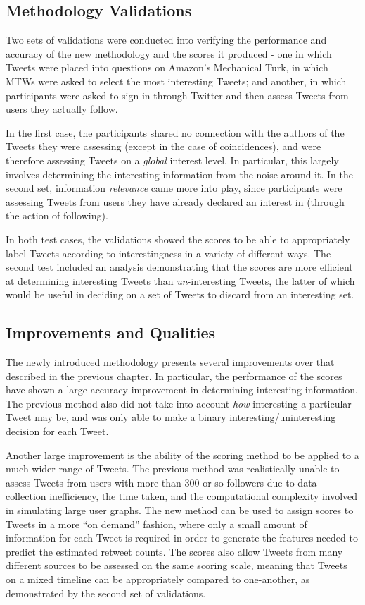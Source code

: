 \subsection{Methodology Validations}
Two sets of validations were conducted into verifying the performance and accuracy of the new methodology and the scores it produced - one in which Tweets were placed into questions on Amazon's Mechanical Turk, in which MTWs were asked to select the most interesting Tweets; and another, in which participants were asked to sign-in through Twitter and then assess Tweets from users they actually follow.

In the first case, the participants shared no connection with the authors of the Tweets they were assessing (except in the case of coincidences), and were therefore assessing Tweets on a \textit{global} interest level. In particular, this largely involves determining the interesting information from the noise around it. In the second set, information \textit{relevance} came more into play, since participants were assessing Tweets from users they have already declared an interest in (through the action of following).

In both test cases, the validations showed the scores to be able to appropriately label Tweets according to interestingness in a variety of different ways. The second test included an analysis demonstrating that the scores are more efficient at determining interesting Tweets than \textit{un}-interesting Tweets, the latter of which would be useful in deciding on a set of Tweets to discard from an interesting set. 


\subsection{Improvements and Qualities}
The newly introduced methodology presents several improvements over that described in the previous chapter. In particular, the performance of the scores have shown a large accuracy improvement in determining interesting information. The previous method also did not take into account \textit{how} interesting a particular Tweet may be, and was only able to make a binary interesting/uninteresting decision for each Tweet.

Another large improvement is the ability of the scoring method to be applied to a much wider range of Tweets. The previous method was realistically unable to assess Tweets from users with more than 300 or so followers due to data collection inefficiency, the time taken, and the computational complexity involved in simulating large user graphs. The new method can be used to assign scores to Tweets in a more ``on demand'' fashion, where only a small amount of information for each Tweet is required in order to generate the features needed to predict the estimated retweet counts. The scores also allow Tweets from many different sources to be assessed on the same scoring scale, meaning that Tweets on a mixed timeline can be appropriately compared to one-another, as demonstrated by the second set of validations.

